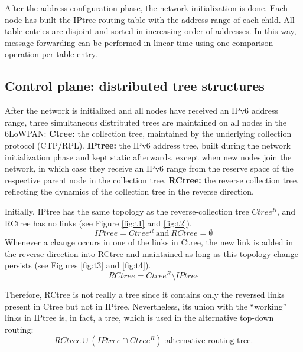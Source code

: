 After the address configuration phase, the network initialization is done.
Each node has built the IPtree routing table with the address range of each
child. All table entries are disjoint and sorted in increasing order of
addresses. In this way, message forwarding can be performed in linear time using
one comparison operation per table entry.


\subsection{Control plane: distributed tree structures}

After the network is initialized and all nodes have received an IPv6
address range, three simultaneous distributed trees are maintained
on all nodes in the 6LoWPAN: \textbf{Ctree:} the collection tree, maintained by the underlying
  collection protocol (CTP/RPL).
	\textbf{IPtree:} the IPv6 address tree, built during the network
  initialization phase and kept static afterwards, except when new
  nodes join the network, in which case they receive an IPv6 range from the reserve space of the respective
parent node in the collection tree.
	\textbf{RCtree:} the reverse collection tree, reflecting the
  dynamics of the collection tree in the reverse direction.

Initially, IPtree has the same topology as the reverse-collection tree
$Ctree^{R}$, and RCtree has no links (see Figure \ref{fig:t1} and
\ref{fig:t2}).
$$
IPtree = Ctree^{R} \ \text{and} \ RCtree = \emptyset
$$
Whenever a change occurs in one of the links in Ctree, the new link
is added in the reverse direction into RCtree and maintained as long
as this topology change persists (see Figures \ref{fig:t3} and
\ref{fig:t4}).
$$
RCtree = Ctree^{R} \setminus IPtree
$$

Therefore, RCtree is not really a tree since it contains only the
reversed links present in Ctree but not in IPtree. Nevertheless, its
union with the ``working'' links in IPtree is, in fact, a tree,
which is used in the alternative top-down routing:
$$
RCtree \cup (IPtree \cap Ctree^{R}) \  \text{:alternative routing tree.}
$$

